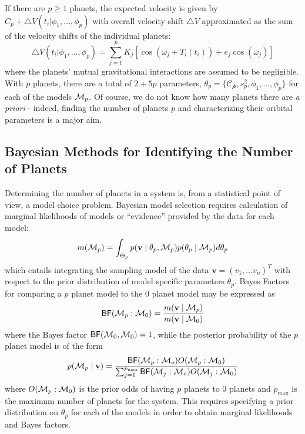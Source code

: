 \documentclass[aoas]{imsart}
\def\BF{\textsf{BF}}
\def\M{{\cal{M}}}
\def\v{\mathbf{v}}
\begin{document}
If there are $p\ge 1$ planets, the expected velocity is given by $C_p
+ \bigtriangleup V(t_i|\phi_1,\ldots,\phi_p)$ with overall velocity shift
$\bigtriangleup V$  approximated as the sum of the velocity
shifts of the individual planets:
\begin{equation}\label{Velocity_2p_Model}
\bigtriangleup V(t_i|\phi_1,\ldots,\phi_p)=\sum_{j=1}^p
K_j[\cos(\omega_j+T_i(t_i))+e_j\cos(\omega_j)]
\end{equation}
where the planets' mutual gravitational interactions are assumed to be
negligible.  With $p$ planets, there are a total of $2+5p$ parameters,
$\theta_p = \{ \mathcal{C_p},s_p^2,\phi_1,\ldots,\phi_p\}$ for each of the
models $\M_p$. Of course, we do not know how many planets there are
\emph{a priori} - indeed, finding the number of planets $p$ and
characterizing their oribital parameters is a major aim. 

\subsection{Bayesian Methods for Identifying the Number of Planets}
Determining the number of planets in a
system is, from a statistical point of view, a model choice
problem. Bayesian model selection requires calculation of marginal
likelihoods of models or ``evidence'' provided by the data for each model:
\begin{equation}\label{marginal_lik}
m( \M_p) = \int_{\Theta_p}
p(\v \mid \theta_p,\M_p) p(\theta_p \mid \M_p) d\theta_p
\end{equation} 
which entails integrating the sampling model of the
data $\v = (v_1, \ldots v_n)^T$ with respect to the prior distribution
of model specific parameters $\theta_p$.
Bayes Factors for comparing a $p$ planet model to the $0$ planet model
may be expressed  as
\begin{equation}
\BF(\M_p:\M_0)=\frac{m( \v \mid \M_p)}{m(\v \mid \M_0)}
\end{equation}
where the Bayes factor $\BF(\M_0,\M_0) = 1$,
while the posterior probability of the $p$ planet model is of the
form
\begin{equation}
  \label{eq:post-prob}
  p(\M_p \mid \v) = \frac{\BF(\M_p:\M_o) O(\M_p: \M_0)} 
{ \sum_{ j= 1}^{p_{\max}} \BF(\M_j:\M_o) O(\M_j: \M_0)}
\end{equation}
where $O(\M_p: \M_0)$ is the prior odds of having $p$ planets to $0$
planets and $p_{\max}$ is the maximum number of planets for the
system.  This requires specifying a prior distribution on $\theta_p$
for each of the models in order to obtain marginal likelihoods and
Bayes factors.
\end{document}
